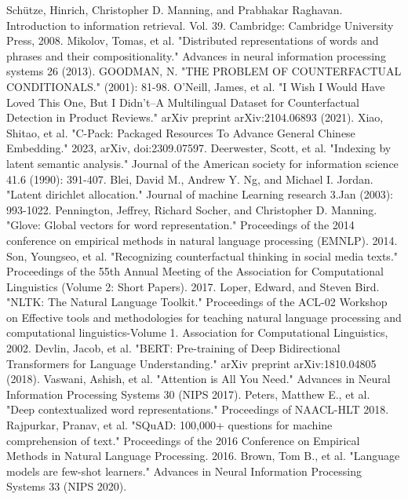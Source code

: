 \documentclass[conference]{IEEEtran}
\begin{document}
\begin{thebibliography}{00}
 Schütze, Hinrich, Christopher D. Manning, and Prabhakar Raghavan. Introduction to information retrieval. Vol. 39. Cambridge: Cambridge University Press, 2008.
 Mikolov, Tomas, et al. "Distributed representations of words and phrases and their compositionality." Advances in neural information processing systems 26 (2013).
 GOODMAN, N. "THE PROBLEM OF COUNTERFACTUAL CONDITIONALS." (2001): 81-98.
 O'Neill, James, et al. "I Wish I Would Have Loved This One, But I Didn't--A Multilingual Dataset for Counterfactual Detection in Product Reviews." arXiv preprint arXiv:2104.06893 (2021).
 Xiao, Shitao, et al. "C-Pack: Packaged Resources To Advance General Chinese Embedding." 2023, arXiv, doi:2309.07597.
 Deerwester, Scott, et al. "Indexing by latent semantic analysis." Journal of the American society for information science 41.6 (1990): 391-407.
 Blei, David M., Andrew Y. Ng, and Michael I. Jordan. "Latent dirichlet allocation." Journal of machine Learning research 3.Jan (2003): 993-1022.
 Pennington, Jeffrey, Richard Socher, and Christopher D. Manning. "Glove: Global vectors for word representation." Proceedings of the 2014 conference on empirical methods in natural language processing (EMNLP). 2014.
 Son, Youngseo, et al. "Recognizing counterfactual thinking in social media texts." Proceedings of the 55th Annual Meeting of the Association for Computational Linguistics (Volume 2: Short Papers). 2017.
 Loper, Edward, and Steven Bird. "NLTK: The Natural Language Toolkit." Proceedings of the ACL-02 Workshop on Effective tools and methodologies for teaching natural language processing and computational linguistics-Volume 1. Association for Computational Linguistics, 2002.
 Devlin, Jacob, et al. "BERT: Pre-training of Deep Bidirectional Transformers for Language Understanding." arXiv preprint arXiv:1810.04805 (2018).
 Vaswani, Ashish, et al. "Attention is All You Need." Advances in Neural Information Processing Systems 30 (NIPS 2017).
 Peters, Matthew E., et al. "Deep contextualized word representations." Proceedings of NAACL-HLT 2018.
 Rajpurkar, Pranav, et al. "SQuAD: 100,000+ questions for machine comprehension of text." Proceedings of the 2016 Conference on Empirical Methods in Natural Language Processing. 2016.
 Brown, Tom B., et al. "Language models are few-shot learners." Advances in Neural Information Processing Systems 33 (NIPS 2020).

\end{thebibliography}
\end{document}

